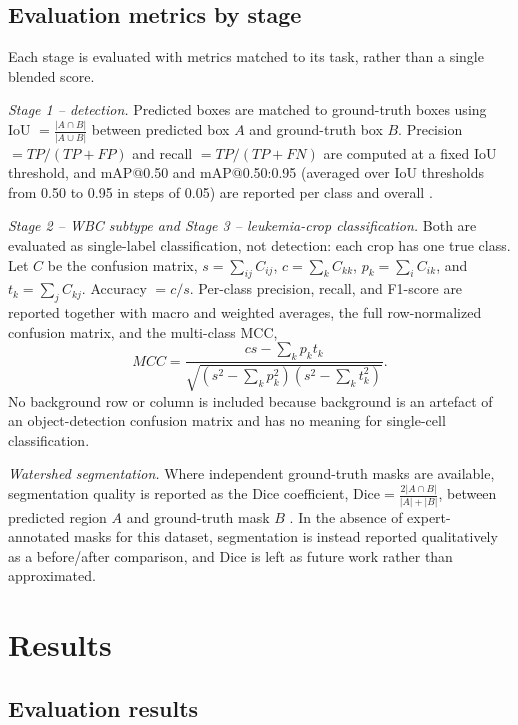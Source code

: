 \documentclass[conference]{IEEEtran}
\begin{document}
\subsection{Evaluation metrics by stage}

Each stage is evaluated with metrics matched to its task, rather than a single blended score.

\emph{Stage 1 -- detection.} Predicted boxes are matched to ground-truth boxes using IoU $= \frac{|A\cap B|}{|A\cup B|}$ between predicted box $A$ and ground-truth box $B$. Precision $= TP/(TP+FP)$ and recall $= TP/(TP+FN)$ are computed at a fixed IoU threshold, and mAP@0.50 and mAP@0.50:0.95 (averaged over IoU thresholds from 0.50 to 0.95 in steps of 0.05) are reported per class and overall \cite{ref_voc}.

\emph{Stage 2 -- WBC subtype and Stage 3 -- leukemia-crop classification.} Both are evaluated as single-label classification, not detection: each crop has one true class. Let $C$ be the confusion matrix, $s=\sum_{ij}C_{ij}$, $c=\sum_k C_{kk}$, $p_k=\sum_i C_{ik}$, and $t_k=\sum_j C_{kj}$. Accuracy $=c/s$. Per-class precision, recall, and F1-score are reported together with macro and weighted averages, the full row-normalized confusion matrix, and the multi-class MCC,
\begin{equation}
MCC=\frac{cs-\sum_k p_k t_k}{\sqrt{(s^2-\sum_k p_k^2)(s^2-\sum_k t_k^2)}}.
\label{eq:mcc}
\end{equation}
No background row or column is included because background is an artefact of an object-detection confusion matrix and has no meaning for single-cell classification.

\emph{Watershed segmentation.} Where independent ground-truth masks are available, segmentation quality is reported as the Dice coefficient, $\text{Dice} = \frac{2|A\cap B|}{|A|+|B|}$, between predicted region $A$ and ground-truth mask $B$ \cite{ref_dice}. In the absence of expert-annotated masks for this dataset, segmentation is instead reported qualitatively as a before/after comparison, and Dice is left as future work rather than approximated.

\section{Results}

\subsection{Evaluation results}
\end{document}
